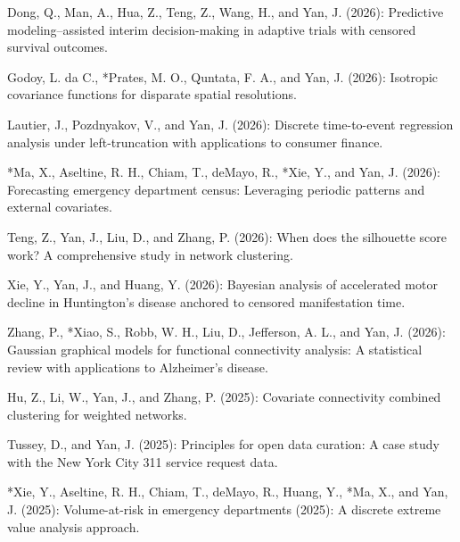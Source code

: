 \begin{CVUnderReview}

\item *Dong, Q., Man, A., Hua, Z., Teng, Z., Wang, H., and Yan, J.
(2026): Predictive modeling--assisted interim decision-making in
adaptive trials with censored survival outcomes.

\item *Godoy, L. da C., *Prates, M. O., Quntata, F.
A., and Yan, J. (2026): Isotropic covariance functions for disparate
spatial resolutions.

\item *Lautier, J., Pozdnyakov, V., and Yan, J. (2026): Discrete
time-to-event regression analysis under left-truncation with
applications to consumer finance.

\item {*Ma, X., Aseltine, R. H., Chiam, T., deMayo, R.,
*Xie, Y., and Yan, J.} (2026): Forecasting emergency
department census: Leveraging periodic patterns and external covariates.

\item Teng, Z., Yan, J., Liu, D., and Zhang, P. (2026): When does the
silhouette score work? A comprehensive study in network clustering.

\item *Xie, Y., Yan, J., and Huang, Y. (2026): Bayesian analysis
of accelerated motor decline in Huntington's disease anchored to
censored manifestation time.

\item Zhang, P., *Xiao, S., Robb, W. H., Liu, D., Jefferson, A.
L., and Yan, J. (2026): Gaussian graphical models for functional
connectivity analysis: A statistical review with applications to
Alzheimer's disease.

\item *Hu, Z., Li, W., Yan, J., and Zhang, P. (2025): Covariate
connectivity combined clustering for weighted networks.

\item Tussey, D., and Yan, J. (2025): Principles for open data curation: A
case study with the New York City 311 service request data.

\item {*Xie, Y., Aseltine, R. H., Chiam, T., deMayo, R., Huang,
Y., *Ma, X., and Yan, J.} (2025): Volume-at-risk in
emergency departments (2025): A discrete extreme value analysis
approach.


\end{CVUnderReview}
